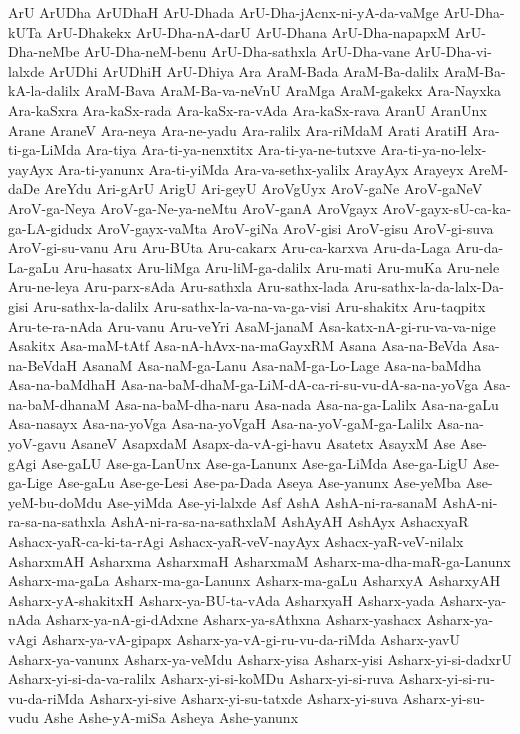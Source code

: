{ArU
ArUDha
ArUDhaH
ArU-Dhada
ArU-Dha-jAcnx-ni-yA-da-vaMge
ArU-Dha-kUTa
ArU-Dhakekx
ArU-Dha-nA-darU
ArU-Dhana
ArU-Dha-napapxM
ArU-Dha-neMbe
ArU-Dha-neM-benu
ArU-Dha-sathxla
ArU-Dha-vane
ArU-Dha-vi-lalxde
ArUDhi
ArUDhiH
ArU-Dhiya
Ara
AraM-Bada
AraM-Ba-dalilx
AraM-Ba-kA-la-dalilx
AraM-Bava
AraM-Ba-va-neVnU
AraMga
AraM-gakekx
Ara-Nayxka
Ara-kaSxra
Ara-kaSx-rada
Ara-kaSx-ra-vAda
Ara-kaSx-rava
AranU
AranUnx
Arane
AraneV
Ara-neya
Ara-ne-yadu
Ara-ralilx
Ara-riMdaM
Arati
AratiH
Ara-ti-ga-LiMda
Ara-tiya
Ara-ti-ya-nenxtitx
Ara-ti-ya-ne-tutxve
Ara-ti-ya-no-lelx-yayAyx
Ara-ti-yanunx
Ara-ti-yiMda
Ara-va-sethx-yalilx
ArayAyx
Arayeyx
AreM-daDe
AreYdu
Ari-gArU
ArigU
Ari-geyU
AroVgUyx
AroV-gaNe
AroV-gaNeV
AroV-ga-Neya
AroV-ga-Ne-ya-neMtu
AroV-ganA
AroVgayx
AroV-gayx-sU-ca-ka-ga-LA-gidudx
AroV-gayx-vaMta
AroV-giNa
AroV-gisi
AroV-gisu
AroV-gi-suva
AroV-gi-su-vanu
Aru
Aru-BUta
Aru-cakarx
Aru-ca-karxva
Aru-da-Laga
Aru-da-La-gaLu
Aru-hasatx
Aru-liMga
Aru-liM-ga-dalilx
Aru-mati
Aru-muKa
Aru-nele
Aru-ne-leya
Aru-parx-sAda
Aru-sathxla
Aru-sathx-lada
Aru-sathx-la-da-lalx-Da-gisi
Aru-sathx-la-dalilx
Aru-sathx-la-va-na-va-ga-visi
Aru-shakitx
Aru-taqpitx
Aru-te-ra-nAda
Aru-vanu
Aru-veYri
AsaM-janaM
Asa-katx-nA-gi-ru-va-va-nige
Asakitx
Asa-maM-tAtf
Asa-nA-hAvx-na-maGayxRM
Asana
Asa-na-BeVda
Asa-na-BeVdaH
AsanaM
Asa-naM-ga-Lanu
Asa-naM-ga-Lo-Lage
Asa-na-baMdha
Asa-na-baMdhaH
Asa-na-baM-dhaM-ga-LiM-dA-ca-ri-su-vu-dA-sa-na-yoVga
Asa-na-baM-dhanaM
Asa-na-baM-dha-naru
Asa-nada
Asa-na-ga-Lalilx
Asa-na-gaLu
Asa-nasayx
Asa-na-yoVga
Asa-na-yoVgaH
Asa-na-yoV-gaM-ga-Lalilx
Asa-na-yoV-gavu
AsaneV
AsapxdaM
Asapx-da-vA-gi-havu
Asatetx
AsayxM
Ase
Ase-gAgi
Ase-gaLU
Ase-ga-LanUnx
Ase-ga-Lanunx
Ase-ga-LiMda
Ase-ga-LigU
Ase-ga-Lige
Ase-gaLu
Ase-ge-Lesi
Ase-pa-Dada
Aseya
Ase-yanunx
Ase-yeMba
Ase-yeM-bu-doMdu
Ase-yiMda
Ase-yi-lalxde
Asf
AshA
AshA-ni-ra-sanaM
AshA-ni-ra-sa-na-sathxla
AshA-ni-ra-sa-na-sathxlaM
AshAyAH
AshAyx
AshacxyaR
Ashacx-yaR-ca-ki-ta-rAgi
Ashacx-yaR-veV-nayAyx
Ashacx-yaR-veV-nilalx
AsharxmAH
Asharxma
AsharxmaH
AsharxmaM
Asharx-ma-dha-maR-ga-Lanunx
Asharx-ma-gaLa
Asharx-ma-ga-Lanunx
Asharx-ma-gaLu
AsharxyA
AsharxyAH
Asharx-yA-shakitxH
Asharx-ya-BU-ta-vAda
AsharxyaH
Asharx-yada
Asharx-ya-nAda
Asharx-ya-nA-gi-dAdxne
Asharx-ya-sAthxna
Asharx-yashacx
Asharx-ya-vAgi
Asharx-ya-vA-gipapx
Asharx-ya-vA-gi-ru-vu-da-riMda
Asharx-yavU
Asharx-ya-vanunx
Asharx-ya-veMdu
Asharx-yisa
Asharx-yisi
Asharx-yi-si-dadxrU
Asharx-yi-si-da-va-ralilx
Asharx-yi-si-koMDu
Asharx-yi-si-ruva
Asharx-yi-si-ru-vu-da-riMda
Asharx-yi-sive
Asharx-yi-su-tatxde
Asharx-yi-suva
Asharx-yi-su-vudu
Ashe
Ashe-yA-miSa
Asheya
Ashe-yanunx
}
